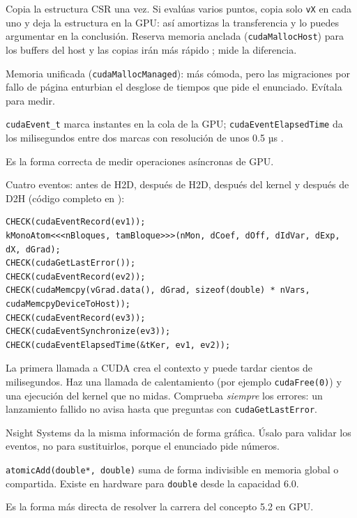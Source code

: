 \como Copia la estructura CSR una vez. Si evalúas varios puntos, copia solo \texttt{vX} en cada uno y deja la estructura en la GPU: así amortizas la transferencia y lo puedes argumentar en la conclusión. Reserva memoria anclada (\texttt{cudaMallocHost}) para los buffers del host y las copias irán más rápido \pv; mide la diferencia.

\alt Memoria unificada (\texttt{cudaMallocManaged}): más cómoda, pero las migraciones por fallo de página enturbian el desglose de tiempos que pide el enunciado. Evítala para medir.

\que \texttt{cudaEvent\_t} marca instantes en la cola de la GPU; \texttt{cudaEventElapsedTime} da los milisegundos entre dos marcas con resolución de unos 0.5 µs \pv.

\porque Es la forma correcta de medir operaciones asíncronas de GPU.

\como Cuatro eventos: antes de H2D, después de H2D, después del kernel y después de D2H (código completo en ):
\begin{lstlisting}[language=CUDA]
CHECK(cudaEventRecord(ev1));
kMonoAtom<<<nBloques, tamBloque>>>(nMon, dCoef, dOff, dIdVar, dExp, dX, dGrad);
CHECK(cudaGetLastError());
CHECK(cudaEventRecord(ev2));
CHECK(cudaMemcpy(vGrad.data(), dGrad, sizeof(double) * nVars, cudaMemcpyDeviceToHost));
CHECK(cudaEventRecord(ev3));
CHECK(cudaEventSynchronize(ev3));
CHECK(cudaEventElapsedTime(&tKer, ev1, ev2));
\end{lstlisting}

\begin{trampa}
La primera llamada a CUDA crea el contexto y puede tardar cientos de milisegundos. Haz una llamada de calentamiento (por ejemplo \texttt{cudaFree(0)}) y una ejecución del kernel que no midas. Comprueba \emph{siempre} los errores: un lanzamiento fallido no avisa hasta que preguntas con \texttt{cudaGetLastError}.
\end{trampa}

\alt Nsight Systems da la misma información de forma gráfica. Úsalo para validar los eventos, no para sustituirlos, porque el enunciado pide números.

\que \texttt{atomicAdd(double*, double)} suma de forma indivisible en memoria global o compartida. Existe en hardware para \texttt{double} desde la capacidad 6.0.

\porque Es la forma más directa de resolver la carrera del concepto 5.2 en GPU.

